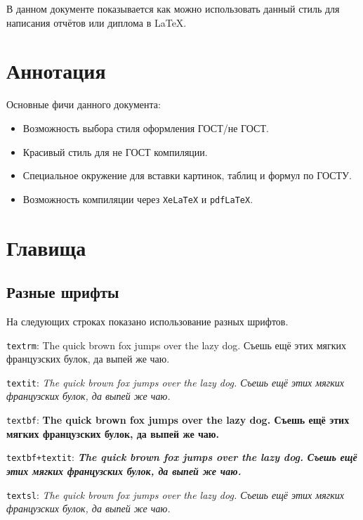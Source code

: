 \documentclass{universityreport}
\begin{document}


\tableofcontents\fixTexttTextscSpaceBug


В данном документе показывается как можно использовать данный стиль для написания отчётов или диплома в \LaTeX.

\chapter{Аннотация}

Основные фичи данного документа:

\begin{itemize}
	\item Возможность выбора стиля оформления ГОСТ/не ГОСТ.
	\item Красивый стиль для не ГОСТ компиляции.
	\item Специальное окружение для вставки картинок, таблиц и формул по ГОСТУ.
	\item Возможность компиляции через \texttt{XeLaTeX} и \texttt{pdfLaTeX}.
\end{itemize}

\chapter{Главища}

\section{Разные шрифты}

На следующих строках показано использование разных шрифтов.

\texttt{textrm}: \textrm{The quick brown fox jumps over the lazy dog. Съешь ещё этих мягких французских булок, да выпей же чаю.}

\texttt{textit}: \textit{The quick brown fox jumps over the lazy dog. Съешь ещё этих мягких французских булок, да выпей же чаю.} 

\texttt{textbf}: \textbf{The quick brown fox jumps over the lazy dog. Съешь ещё этих мягких французских булок, да выпей же чаю.}

\texttt{textbf+textit}: \textbf{\textit{The quick brown fox jumps over the lazy dog. Съешь ещё этих мягких французских булок, да выпей же чаю.}}

\texttt{textsl}: \textsl{The quick brown fox jumps over the lazy dog. Съешь ещё этих мягких французских булок, да выпей же чаю.}
\end{document}
